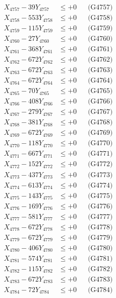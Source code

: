 \documentclass[a4paper,10pt]{article}
\begin{document}
{\begin{align}
X_{4757} - 39Y_{4757} &\leq +0 && \text{(G4757)} \\
X_{4758} - 553Y_{4758} &\leq +0 && \text{(G4758)} \\
X_{4759} - 115Y_{4759} &\leq +0 && \text{(G4759)} \\
X_{4760} - 27Y_{4760} &\leq +0 && \text{(G4760)} \\
\allowbreak
X_{4761} - 368Y_{4761} &\leq +0 && \text{(G4761)} \\
X_{4762} - 672Y_{4762} &\leq +0 && \text{(G4762)} \\
X_{4763} - 672Y_{4763} &\leq +0 && \text{(G4763)} \\
X_{4764} - 672Y_{4764} &\leq +0 && \text{(G4764)} \\
X_{4765} - 70Y_{4765} &\leq +0 && \text{(G4765)} \\
X_{4766} - 408Y_{4766} &\leq +0 && \text{(G4766)} \\
X_{4767} - 279Y_{4767} &\leq +0 && \text{(G4767)} \\
X_{4768} - 381Y_{4768} &\leq +0 && \text{(G4768)} \\
X_{4769} - 672Y_{4769} &\leq +0 && \text{(G4769)} \\
X_{4770} - 118Y_{4770} &\leq +0 && \text{(G4770)} \\
\allowbreak
X_{4771} - 667Y_{4771} &\leq +0 && \text{(G4771)} \\
X_{4772} - 152Y_{4772} &\leq +0 && \text{(G4772)} \\
X_{4773} - 437Y_{4773} &\leq +0 && \text{(G4773)} \\
X_{4774} - 613Y_{4774} &\leq +0 && \text{(G4774)} \\
X_{4775} - 143Y_{4775} &\leq +0 && \text{(G4775)} \\
X_{4776} - 169Y_{4776} &\leq +0 && \text{(G4776)} \\
X_{4777} - 581Y_{4777} &\leq +0 && \text{(G4777)} \\
X_{4778} - 672Y_{4778} &\leq +0 && \text{(G4778)} \\
X_{4779} - 672Y_{4779} &\leq +0 && \text{(G4779)} \\
X_{4780} - 406Y_{4780} &\leq +0 && \text{(G4780)} \\
\allowbreak
X_{4781} - 574Y_{4781} &\leq +0 && \text{(G4781)} \\
X_{4782} - 115Y_{4782} &\leq +0 && \text{(G4782)} \\
X_{4783} - 672Y_{4783} &\leq +0 && \text{(G4783)} \\
X_{4784} - 72Y_{4784} &\leq +0 && \text{(G4784)} \\

\end{align}}
\end{document}
